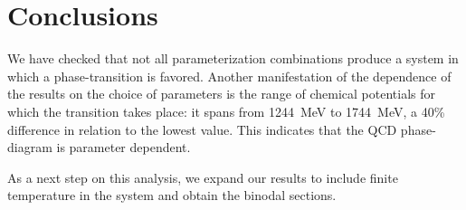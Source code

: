 \documentclass[prc, reprint, amsmath, floatfix,10pt]{revtex4-1}
\begin{document}

\section{Conclusions}



We have checked  that not all parameterization combinations produce a
system in which a phase-transition is favored. 
Another manifestation of the dependence of the results on the choice
of parameters is the range of chemical potentials for which the
transition takes place: it spans from 1244~MeV to 1744~MeV, a 40\%
difference in relation to the lowest value.  This indicates that the
QCD phase-diagram is parameter dependent.

As a next step on this analysis, we expand our results to include
finite temperature in the system and obtain the binodal sections.

%
%







\end{document}
